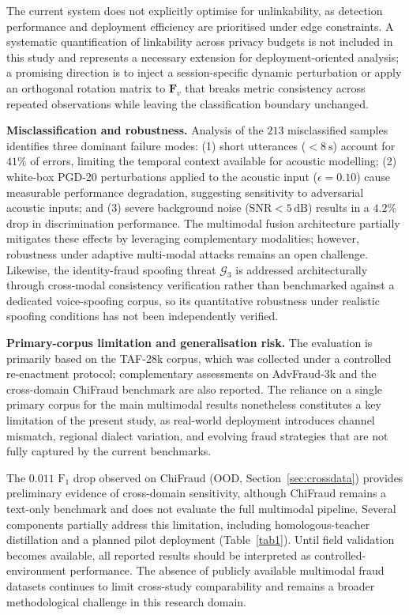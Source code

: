 \documentclass[a4paper,fleqn]{cas-sc}
\begin{document}
The current system does not explicitly optimise for unlinkability, as detection performance and deployment efficiency are prioritised under edge constraints. A systematic quantification of linkability across privacy budgets is not included in this study and represents a necessary extension for deployment-oriented analysis; a promising direction is to inject a session-specific dynamic perturbation or apply an orthogonal rotation matrix to $\bm{F}_v$ that breaks metric consistency across repeated observations while leaving the classification boundary unchanged.

\textbf{Misclassification and robustness.}
Analysis of the $213$ misclassified samples identifies three dominant failure modes: (1) short utterances ($< 8~\text{s}$) account for $41\%$ of errors, limiting the temporal context available for acoustic modelling; (2) white-box PGD-20 perturbations applied to the acoustic input ($\epsilon = 0.10$) cause measurable performance degradation, suggesting sensitivity to adversarial acoustic inputs; and (3) severe background noise ($\text{SNR} < 5\,\text{dB}$) results in a $4.2\%$ drop in discrimination performance. The multimodal fusion architecture partially mitigates these effects by leveraging complementary modalities; however, robustness under adaptive multi-modal attacks remains an open challenge. Likewise, the identity-fraud spoofing threat $\mathcal{G}_3$ is addressed architecturally through cross-modal consistency verification rather than benchmarked against a dedicated voice-spoofing corpus, so its quantitative robustness under realistic spoofing conditions has not been independently verified.

\textbf{Primary-corpus limitation and generalisation risk.}
The evaluation is primarily based on the TAF-28k corpus, which was collected under a controlled re-enactment protocol; complementary assessments on AdvFraud-3k and the cross-domain ChiFraud benchmark are also reported. The reliance on a single primary corpus for the main multimodal results nonetheless constitutes a key limitation of the present study, as real-world deployment introduces channel mismatch, regional dialect variation, and evolving fraud strategies that are not fully captured by the current benchmarks.

The $0.011$ $\text{F}_1$ drop observed on ChiFraud (OOD, Section~\ref{sec:crossdata}) provides preliminary evidence of cross-domain sensitivity, although ChiFraud remains a text-only benchmark and does not evaluate the full multimodal pipeline. Several components partially address this limitation, including homologous-teacher distillation and a planned pilot deployment (Table~\ref{tab1}). Until field validation becomes available, all reported results should be interpreted as controlled-environment performance. The absence of publicly available multimodal fraud datasets continues to limit cross-study comparability and remains a broader methodological challenge in this research domain.
\end{document}

